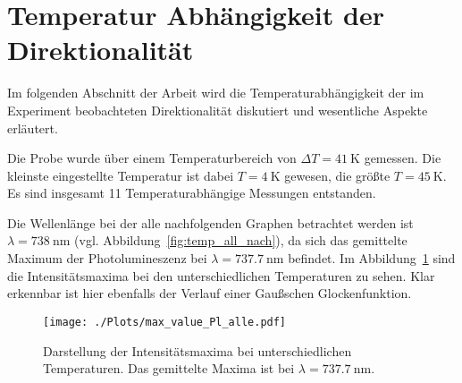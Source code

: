 \section{Temperatur Abhängigkeit der Direktionalität}
Im folgenden Abschnitt der Arbeit wird die Temperaturabhängigkeit der im Experiment
beobachteten Direktionalität diskutiert und wesentliche Aspekte erläutert.

Die Probe wurde über einem Temperaturbereich von $ \Delta T =\SI{41}{\kelvin} $ gemessen.
Die kleinste eingestellte Temperatur ist dabei $T =\SI{4}{\kelvin}$ gewesen, die größte 
$T =\SI{45}{\kelvin}$.
Es sind insgesamt 11 Temperaturabhängige Messungen entstanden.

Die Wellenlänge bei der alle nachfolgenden Graphen betrachtet werden ist $\lambda =\SI{738}{\nano\meter}$ 
(vgl. Abbildung~\ref{fig:temp_all_nach}), da sich das gemittelte Maximum der Photolumineszenz bei
$\lambda =\SI{737,7}{\nano\meter}$ befindet.
Im Abbildung~\ref{fig:int_temp} sind die Intensitätsmaxima bei den unterschiedlichen Temperaturen zu sehen.
Klar erkennbar ist hier ebenfalls der Verlauf einer Gaußschen Glockenfunktion.
\begin{figure}
    \centering
    \texttt{[image: ./Plots/max\_value\_Pl\_alle.pdf]}
    \caption{Darstellung der Intensitätsmaxima bei unterschiedlichen Temperaturen.
    Das gemittelte Maxima ist bei $\lambda =\SI{737,7}{\nano\meter}$.}
    \label{fig:int_temp}
\end{figure}
\FloatBarrier 

